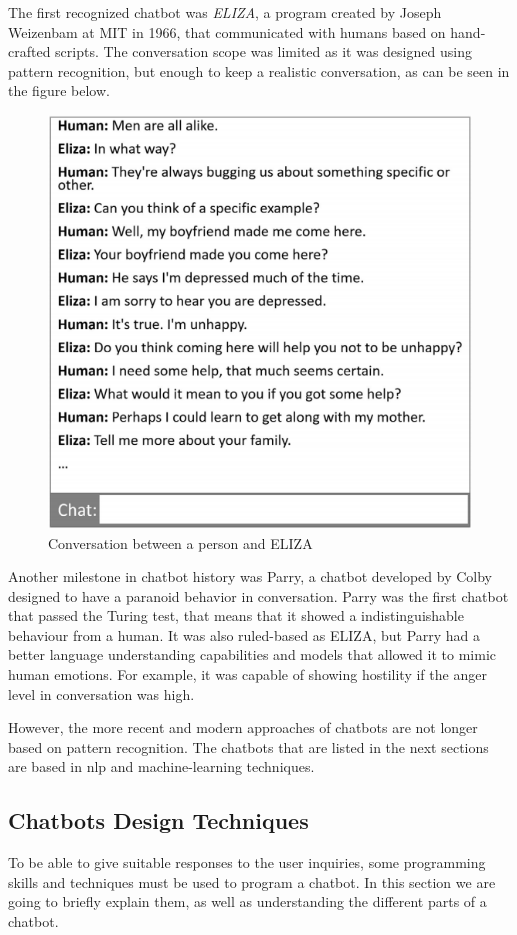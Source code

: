 The first recognized chatbot was \textsl{ELIZA}, a program created by Joseph Weizenbam at MIT in 1966, that communicated with humans based on hand-crafted scripts. The conversation scope was limited as it was designed using pattern recognition, but enough to keep a realistic conversation, as can be seen in the figure below.
\begin{figure}[ht]
\includegraphics[scale=0.5]{docs/img/project_pics/Eliza.png}
\centering
\caption{Conversation between a person and ELIZA \cite{eliza}}
\end{figure}

Another milestone in chatbot history was Parry, a chatbot developed by Colby designed to have a paranoid behavior in conversation. Parry was the first chatbot that passed the Turing test, that means that it showed a indistinguishable behaviour from a human\cite{turing}. It was also ruled-based as ELIZA, but Parry had a better language understanding capabilities and models that allowed it to mimic human emotions. For example, it was capable of showing hostility if the anger level in conversation was high.

However, the more recent and modern approaches of chatbots are not longer based on pattern recognition. The chatbots that are listed in the next sections are based in \acf{nlp} and machine-learning techniques. 
\subsection{Chatbots Design Techniques}
To be able to give suitable responses to the user inquiries, some programming skills and techniques must be used to program a chatbot. In this section we are going to briefly explain them, as well as understanding the different parts of a chatbot.

